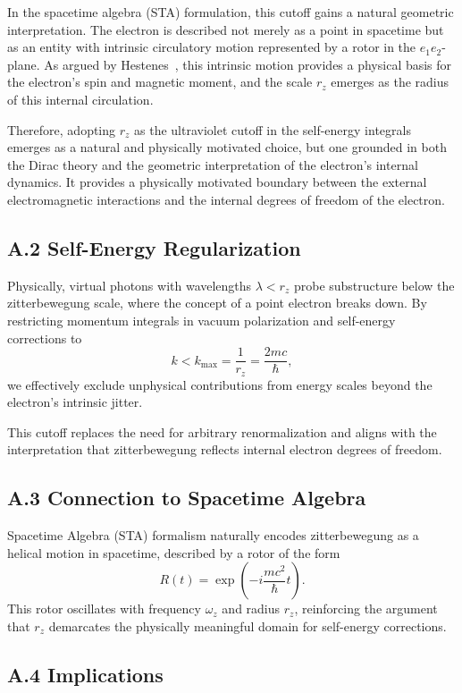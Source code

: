 \documentclass[12pt]{article}
\begin{document}
In the spacetime algebra (STA) formulation, this cutoff gains a natural geometric interpretation. The electron is described not merely as a point in spacetime but as an entity with intrinsic circulatory motion represented by a rotor in the \(e_1e_2\)-plane. As argued by Hestenes~\cite{Hestenes1990}, this intrinsic motion provides a physical basis for the electron’s spin and magnetic moment, and the scale \(r_z\) emerges as the radius of this internal circulation.

Therefore, adopting \(r_z\) as the ultraviolet cutoff in the self-energy integrals emerges as a natural and physically motivated  choice, but one grounded in both the Dirac theory and the geometric interpretation of the electron’s internal dynamics. It provides a physically motivated boundary between the external electromagnetic interactions and the internal degrees of freedom of the electron.

\medskip

\subsection*{A.2 Self-Energy Regularization}

Physically, virtual photons with wavelengths \(\lambda < r_z\) probe substructure below the zitterbewegung scale, where the concept of a point electron breaks down. By restricting momentum integrals in vacuum polarization and self-energy corrections to
\[
k < k_{\mathrm{max}} = \frac{1}{r_z} = \frac{2mc}{\hbar},
\]
we effectively exclude unphysical contributions from energy scales beyond the electron’s intrinsic jitter.

This cutoff replaces the need for arbitrary renormalization and aligns with the interpretation that zitterbewegung reflects internal electron degrees of freedom. 

\subsection*{A.3 Connection to Spacetime Algebra}

Spacetime Algebra (STA) formalism naturally encodes zitterbewegung as a helical motion in spacetime, described by a rotor of the form
\[
R(t) = \exp\left(-i\frac{mc^2}{\hbar} t\right).
\]
This rotor oscillates with frequency \(\omega_z\) and radius \(r_z\), reinforcing the argument that \(r_z\) demarcates the physically meaningful domain for self-energy corrections.

\subsection*{A.4 Implications}
\end{document}
